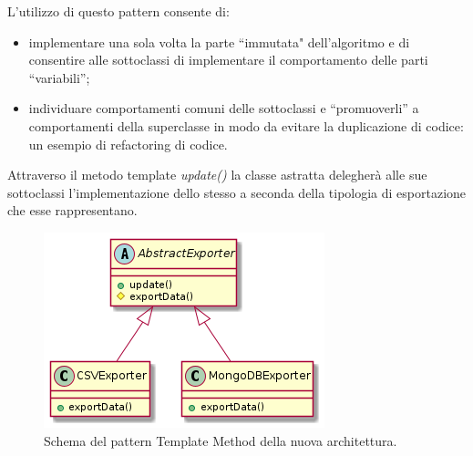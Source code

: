 \documentclass[12pt,a4paper,openright,oneside]{book}
\begin{document}
L'utilizzo di questo pattern consente di:
\begin{itemize}
    \item implementare una sola volta la parte ``immutata" dell’algoritmo e di consentire alle sottoclassi di implementare il comportamento delle parti “variabili”;
    \item individuare comportamenti comuni delle sottoclassi e “promuoverli” a comportamenti della superclasse in modo da evitare la duplicazione di codice: un esempio di refactoring di codice.
\end{itemize}
Attraverso il metodo template \textit{update()} la classe astratta delegherà alle sue sottoclassi l'implementazione dello stesso a seconda della tipologia di esportazione che esse rappresentano.
\begin{figure}
	\centering
	\includegraphics[width=1\linewidth]{images/alchemist-template_method.png}
	\caption{Schema del pattern Template Method della nuova architettura.}
	\label{fig:uml-abstract-exporter}
\end{figure}
\end{document}
